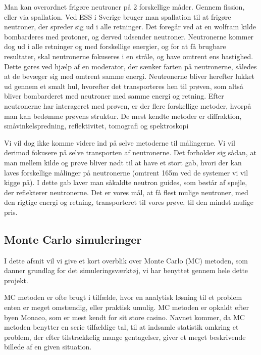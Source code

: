 \documentclass[12pt,oneside,a4paper]{article}
\begin{document}
{{{{{Man kan overordnet frigøre neutroner på 2 forskellige måder. Gennem fission, eller via spallation. Ved ESS i Sverige bruger man spallation til at frigøre neutroner, der spreder sig ud i alle retninger. Det foregår ved at en wolfram kilde bombarderes med protoner, og derved udsender neutroner. Neutronerne kommer dog ud i alle retninger og med forskellige energier, og for at få brugbare resultater, skal neutronerne fokuseres i en stråle, og have omtrent ens hastighed. Dette gøres ved hjælp af en moderator, der sænker farten på neutronerne, således at de bevæger sig med omtrent samme energi. Neutronerne bliver herefter lukket ud gennem et smalt hul, hvorefter det transporteres hen til prøven, som altså bliver bombarderet med neutroner med samme energi og retning. Efter neutronerne har interageret med prøven, er der flere forskellige metoder, hvorpå man kan bedømme prøvens struktur. De mest kendte metoder er diffraktion, småvinkelspredning, reflektivitet, tomografi og spektroskopi \cite{ess_folder}

Vi vil dog ikke komme videre ind på selve metoderne til målingerne. Vi vil derimod fokusere på selve transporten af neutronerne. Det forholder sig sådan, at man mellem kilde og prøve bliver nødt til at have et stort gab, hvori der kan laves forskellige målinger på neutronerne (omtrent 165m ved de systemer vi vil kigge på). I dette gab laver man såkaldte neutron guides, som består af spejle, der reflekterer neutronerne. Det er vores mål, at få flest mulige neutroner, med den rigtige energi og retning, transporteret til vores prøve, til den mindst mulige pris.


\subsection{Monte Carlo simuleringer}
I dette afsnit vil vi give et kort overblik over Monte Carlo (MC) metoden, som danner grundlag for det simuleringsværktøj, vi har benyttet gennem hele dette projekt.

MC metoden er ofte brugt i tilfælde, hvor en analytisk løsning til et problem enten er meget omstændig, eller praktisk umulig. MC metoden er opkaldt efter byen Monaco, som er mest kendt for sit store casino. Navnet kommer, da MC metoden benytter en serie tilfældige tal, til at indsamle statistik omkring et problem, der efter tilstrækkelig mange gentagelser, giver et meget beskrivende billede af en given situation.

}}}}}
\end{document}
